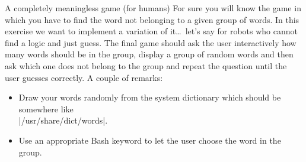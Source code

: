 
\begin{exercise}[Instructive]{A completely meaningless game (for humans)}
    For sure you will know the game in which you have to find the word not belonging to a given group of words.
    In this exercise we want to implement a variation of it\ldots\ let's say for robots who cannot find a logic and just guess.
    The final game should ask the user interactively how many words should be in the group, display a group of random words and then ask which one does not belong to the group and repeat the question until the user guesses correctly.
    A couple of remarks:
    \begin{itemize}[after=\vspace{-\baselineskip}]
        \item Draw your words randomly from the system dictionary which should be somewhere like\\ \bash|/usr/share/dict/words|.
        \item Use an appropriate Bash keyword to let the user choose the word in the group.
    \end{itemize}
    \bigskip
\end{exercise}
